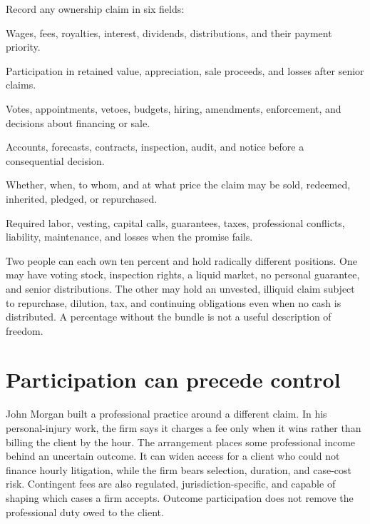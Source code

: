 Record any ownership claim in six fields:

\begin{description}[leftmargin=2.7em,style=nextline,itemsep=0.22em]
\item[Current cash] Wages, fees, royalties, interest, dividends,
  distributions, and their payment priority.
\item[Residual] Participation in retained value, appreciation, sale proceeds,
  and losses after senior claims.
\item[Control] Votes, appointments, vetoes, budgets, hiring, amendments,
  enforcement, and decisions about financing or sale.
\item[Information] Accounts, forecasts, contracts, inspection, audit, and
  notice before a consequential decision.
\item[Liquidity and transfer] Whether, when, to whom, and at what price the
  claim may be sold, redeemed, inherited, pledged, or repurchased.
\item[Duties and downside] Required labor, vesting, capital calls, guarantees,
  taxes, professional conflicts, liability, maintenance, and losses when the
  promise fails.
\end{description}

Two people can each own ten percent and hold radically different positions.
One may have voting stock, inspection rights, a liquid market, no personal
guarantee, and senior distributions. The other may hold an unvested, illiquid
claim subject to repurchase, dilution, tax, and continuing obligations even
when no cash is distributed. A percentage without the bundle is not a useful
description of freedom.

\section{Participation can precede control}

John Morgan built a professional practice around a different claim. In his
personal-injury work, the firm says it charges a fee only when it wins rather
than billing the client by the hour. The arrangement places some professional
income behind an uncertain outcome. It can widen access for a client who could
not finance hourly litigation, while the firm bears selection, duration, and
case-cost risk. Contingent fees are also regulated, jurisdiction-specific, and
capable of shaping which cases a firm accepts. Outcome participation does not
remove the professional duty owed to the client.

